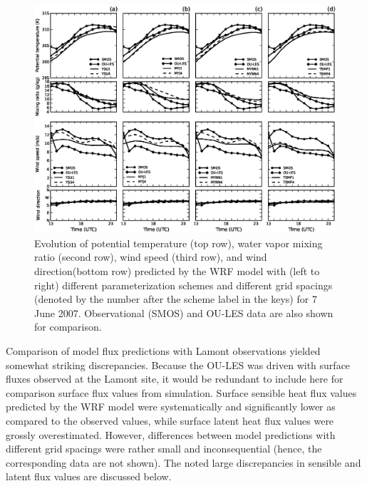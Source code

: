 \begin{figure}[ht!]
\begin{center}
\includegraphics[width=\textwidth]{figures/chapter4/meteogram_grid_20070607}
\end{center}
\caption{Evolution of potential temperature (top row), water vapor mixing ratio (second row), wind speed (third row), and wind direction(bottom row) predicted by the WRF model with (left to right) different parameterization schemes and different grid spacings (denoted by the number after the scheme label in the keys) for 7 June 2007. Observational (SMOS) and OU-LES data are also shown for comparison.}
\label{figure404}
\end{figure}


Comparison of model flux predictions with Lamont observations yielded somewhat striking discrepancies. Because the OU-LES was driven with surface fluxes observed at the Lamont site, it would be redundant to include here for comparison surface flux values from simulation. Surface sensible heat flux values predicted by the WRF model were systematically and significantly lower as compared to the observed values, while surface latent heat flux values were grossly overestimated. However, differences between model predictions with different grid spacings were rather small and inconsequential (hence, the corresponding data are not shown). The noted large discrepancies in sensible and latent flux values are discussed below. 

